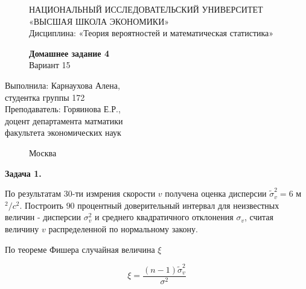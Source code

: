 \documentclass[]{article}
\begin{document}
	\begin{figure}[t]
		\centering
		\large
		НАЦИОНАЛЬНЫЙ ИССЛЕДОВАТЕЛЬСКИЙ УНИВЕРСИТЕТ\\
		«ВЫСШАЯ ШКОЛА ЭКОНОМИКИ»\\
		Дисциплина: «Теория вероятностей и математическая статистика»
	\end{figure}
	
	\begin{figure}[h]
	\vspace{3in}
	\centering
	\Huge
	\textbf{Домашнее задание 4}\\
	Вариант 15 
	\end{figure}
	
	\vspace{2in}
	\Large
	\raggedleft
	Выполнила: Карнаухова Алена,\\
	студентка группы 172\\
	\vspace{12pt}
	Преподаватель: Горяинова Е.Р.,\\
	доцент департамента матматики\\
	факультета экономических наук
	
	\begin{figure}[b]
		\centering
		Москва \the\year
	\end{figure}
	
	\thispagestyle{empty}
	
	\newpage
	
	\centering
	\Large
	\textbf{Задача 1.}
	
	\vspace{10pt}
	
	\raggedright
	
	По результатам 30-ти измрения скорости $v$ получена оценка дисперсии $\tilde{\sigma}^2_v = 6 $ м$^2 / c^2$. Построить $90$ процентный доверительный интервал для неизвестных величин  - дисперсии $\sigma^2_v$ и среднего квадратичного отклонения $\sigma_v$, считая величину $v$ распределенной по нормальному закону.
	
	\vspace{20pt}
	
	По теореме Фишера случайная величина $\xi$
	
	\vspace{10pt}
	
	$$\xi = \frac{(n-1) \tilde{\sigma}^2_v}{\sigma^2}$$\\
	
	\vspace{10pt}
	
\end{document}
